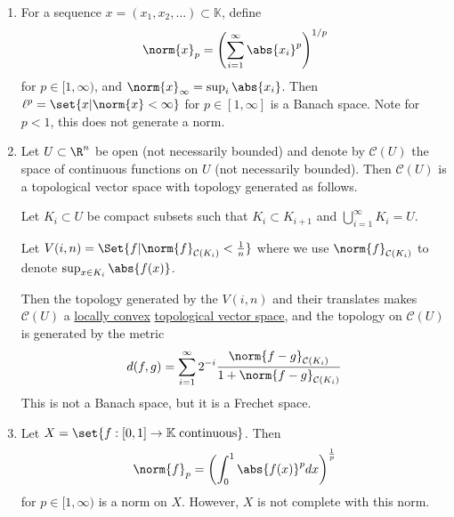 \documentclass{article}
\newcommand{\K}{\mathbb{K}}
\begin{document}
\begin{eg}
\begin{enumerate}[label=(\roman*)]
\begin{equation*}
            \end{equation*}
            Then $C^\K(\bar{U})$ is a Banach space.
        \item For a sequence $x = (x_1, x_2, \dotsc) \subset \K$, define
            \begin{equation*}
                \norm{x}_p = \left(\sum_{i=1}^\infty \abs{x_i}^p\right)^{1/p}
            \end{equation*}
            for $p \in [1, \infty)$, and $\norm{x}_\infty = \sup_i \abs{x_i}$.  Then $\ell^p = \set{x | \norm{x} < \infty}$ for $p \in [1, \infty]$ is a Banach space.  Note for $p<1$, this does not generate a norm.
        \item Let $U \subset \R^n$ be open (not necessarily bounded) and denote by $\mathcal{C}(U)$ the space of continuous functions on $U$ (not necessarily bounded). Then $\mathcal{C}(U)$ is a topological vector space with topology generated as follows.

            Let $K_i \subset U$ be compact subsets such that $K_i \subset K_{i+1}$ and $\bigcup_{i=1}^\infty K_i = U$.

            Let $V(i, n) = \Set{f | \norm{f}_{\mathcal{C}(K_i)} < \frac1n}$ where we use $\norm{f}_{\mathcal{C}(K_i)}$ to denote $\sup_{x \in K_i} \abs{f(x)}$.

            Then the topology generated by the $V(i, n)$ and their translates makes $\mathcal{C}(U)$ a \hyperlink{def:locallyConvex}{locally convex} \hyperlink{def:topologicalVectorSpace}{topological vector space}, and the topology on $\mathcal{C}(U)$ is generated by the metric
            \begin{equation*}
                d(f, g) = \sum_{i=1}^\infty 2^{-i} \frac{\norm{f-g}_{\mathcal{C}(K_i)}}{1 + \norm{f-g}_{\mathcal{C}(K_i)}}
            \end{equation*}
            This is not a Banach space, but it is a Frechet space.

        \item Let $X = \set{f : [0, 1] \to \K \; \text{continuous}}$. Then
            \begin{equation*}
                \norm{f}_p = \left(\int_0^1 \abs{f(x)}^p dx\right)^\frac1p
            \end{equation*}
            for $p \in [1, \infty)$ is a norm on $X$. However, $X$ is not complete with this norm.
    \end{enumerate}
\end{eg}

\end{document}
